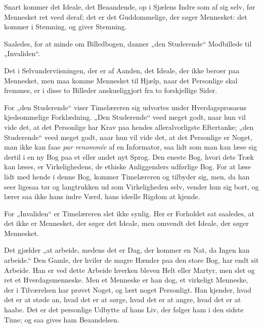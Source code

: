 \documentclass[12pt,a4paper]{book}
\newcommand{\apage}[1]{\marginnote{\footnotesize\textit{[#1]}}}
\begin{document}
Snart kommer det Ideale, det Beaandende, op i Sjælens Indre som af sig
selv, før Mennesket ret veed deraf; det er det Guddommelige, der søger
Mennesket: det kommer i Stemning, og giver Stemning.

Saaledes, for at minde om Billedbogen, danner „den Studerende“ Modbillede
til „Invaliden“.

Det i Selvunderviisningen, der er af Aanden, det Ideale, der ikke beroer
paa Mennesket, men maa komme Mennesket til Hjælp, naar det Personlige skal
fremmes, er i disse to Billeder anskueliggjort fra to forskjellige Sider.

For „den Studerende“ viser Timelæreren sig udvortes under
Hverdagsprosaens kjedsommelige Forklædning. „Den Studerende“ veed meget
godt, naar hun vil vide det, at det Personlige har Krav paa hendes
alleralvorligste Eftertanke; „den Studerende“ veed meget godt, naar hun vil
vide det, at det Personlige er Noget, man ikke kan faae \textit{par
renommée} af en Informator, saa lidt som man kan læse sig dertil i en ny
Bog paa et eller andet nyt Sprog. Den eneste Bog, hvori dets Træk kan
læses, er Virkelighedens, de ethiske Anliggenders udførlige Bog. For at
læse lidt med hende i denne Bog, kommer Timelæreren og tilbyder sig, men,
da han seer ligesaa tør og langtrukken ud som Virkeligheden selv, vender
hun sig bort, og lærer saa ikke hans indre Værd, hans ideelle Rigdom at
kjende.

For „Invaliden“ er Timelæreren slet ikke synlig. Her er Forholdet sat
saaledes, at det ikke er Mennesket, der søger det Ideale, men omvendt det
Ideale, der søger Mennesket.

Det gjælder „at arbeide, medens det er Dag, der kommer en Nat, da Ingen kan
arbeide.“ Den Gamle, \apage{112} der hviler de
magre Hænder paa den store Bog, har endt sit Arbeide. Han er ved dette
Arbeide hverken bleven Helt eller Martyr, men slet og ret et
Hverdagsmenneske. Men et Menneske er han dog, et virkeligt Menneske, der i
Tilværelsen har prøvet Noget, og lært noget Personligt. Han kjender, hvad
det er at støde an, hvad det er at sørge, hvad det er at angre, hvad det er
at haabe. Det er det personlige Udbytte af hans Liv, der følger ham i den
sidste Time; og saa gives ham Beaandelsen.
\end{document}
